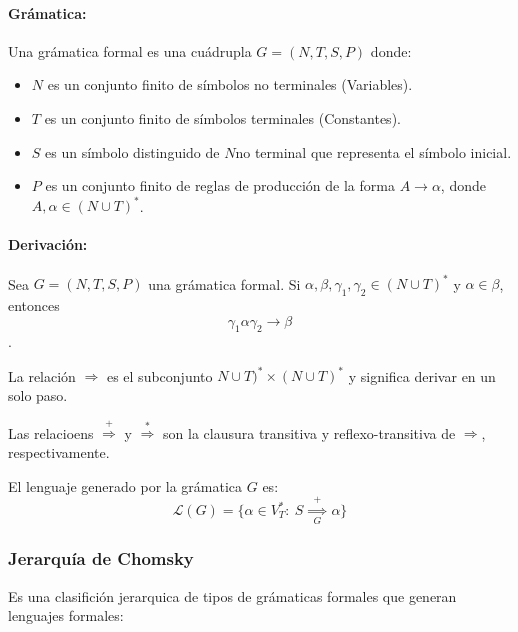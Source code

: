 \paragraph{Grámatica:} Una grámatica formal es una cuádrupla \(G = (N, T, S, P)\) donde:
\begin{itemize}
  \item[] \(N\) es un conjunto finito de símbolos no terminales (Variables).
  \item[]  \(T\) es un conjunto finito de símbolos terminales (Constantes).
  \item[]  \(S\) es un símbolo distinguido de \(N\)no terminal que representa el símbolo inicial.
  \item[]  \(P\) es un conjunto finito de reglas de producción de la forma \(A \rightarrow \alpha\), donde \(A,\alpha \in (N\cup T)^*\).
\end{itemize}

\paragraph{Derivación:} Sea \(G = (N, T, S, P)\) una grámatica formal. Si \(\alpha,\beta,\gamma_1,\gamma_2 \in (N\cup T)^*\) y \(\alpha \in \beta\), entonces \[\gamma_1\alpha\gamma_2\rightarrow \beta\].

La relación \(\Rightarrow\) es el subconjunto \(N\cup T)^*\times (N\cup T)^*\) y significa derivar en un solo paso.

Las relacioens \(\overset{+}{\Rightarrow}\) y \(\overset{*}{\Rightarrow}\) son la clausura transitiva y reflexo-transitiva de \(\Rightarrow\), respectivamente.

El lenguaje generado por la grámatica \(G\) es: \[ \mathcal{L}(G) = \{ \alpha\in V_T^*:~S\overset{+}{\underset{G}{\implies}}\alpha\}\]

\subsubsection{Jerarquía de Chomsky}
Es una clasifición jerarquica de tipos de grámaticas formales que generan lenguajes formales:


